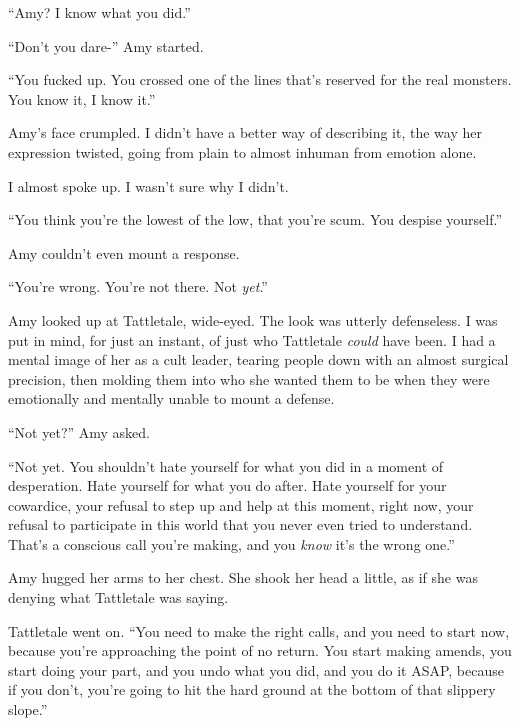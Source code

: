 ``Amy?  I know what you did.''



``Don't you dare-'' Amy started.



``You fucked up.  You crossed one of the lines that's reserved for the real monsters.  You know it, I know it.''



Amy's face crumpled.  I didn't have a better way of describing it, the way her expression twisted, going from plain to almost inhuman from emotion alone.



I almost spoke up.  I wasn't sure why I didn't.



``You think you're the lowest of the low, that you're scum.  You despise yourself.''



Amy couldn't even mount a response.



``You're wrong.  You're not there.  Not \emph{yet}.''



Amy looked up at Tattletale, wide-eyed.  The look was utterly defenseless.  I was put in mind, for just an instant, of just who Tattletale \emph{could} have been.  I had a mental image of her as a cult leader, tearing people down with an almost surgical precision, then molding them into who she wanted them to be when they were emotionally and mentally unable to mount a defense.



``Not yet?'' Amy asked.



``Not yet.  You shouldn't hate yourself for what you did in a moment of desperation.  Hate yourself for what you do after.  Hate yourself for your cowardice, your refusal to step up and help at this moment, right now, your refusal to participate in this world that you never even tried to understand.  That's a conscious call you're making, and you \emph{know} it's the wrong one.''



Amy hugged her arms to her chest.  She shook her head a little, as if she was denying what Tattletale was saying.



Tattletale went on.  ``You need to make the right calls, and you need to start now, because you're approaching the point of no return.  You start making amends, you start doing your part, and you undo what you did, and you do it ASAP, because if you don't, you're going to hit the hard ground at the bottom of that slippery slope.''



